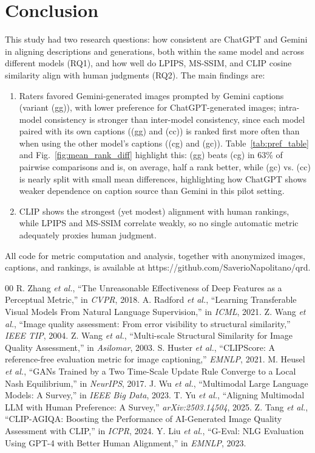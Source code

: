 \documentclass[conference]{IEEEtran}
\begin{document}
\section{Conclusion}
This study had two research questions: how consistent are ChatGPT and Gemini in aligning descriptions and generations, both within the same model and across different models (RQ1), and how well do LPIPS, MS-SSIM, and CLIP cosine similarity align with human judgments (RQ2). The main findings are:
\begin{enumerate}
  \item[RQ1] Raters favored Gemini-generated images prompted by Gemini captions (variant (gg)), with lower preference for ChatGPT-generated images; intra-model consistency is stronger than inter-model consistency, since each model paired with its own captions ((gg) and (cc)) is ranked first more often than when using the other model's captions ((cg) and (gc)). Table~\ref{tab:pref_table} and Fig.~\ref{fig:mean_rank_diff} highlight this: (gg) beats (cg) in 63\% of pairwise comparisons and is, on average, half a rank better, while (gc) vs. (cc) is nearly split with small mean differences, highlighting how ChatGPT shows weaker dependence on caption source than Gemini in this pilot setting.
  \item[RQ2] CLIP shows the strongest (yet modest) alignment with human rankings, while LPIPS and MS-SSIM correlate weakly, so no single automatic metric adequately proxies human judgment.
\end{enumerate}
All code for metric computation and analysis, together with anonymized images, captions,
and rankings, is available at https://github.com/SaverioNapolitano/qrd.
\begin{thebibliography}{00}
 R. Zhang \emph{et al.}, ``The Unreasonable Effectiveness of Deep Features as a Perceptual Metric,'' in \emph{CVPR}, 2018.
 A. Radford \emph{et al.}, ``Learning Transferable Visual Models From Natural Language Supervision,'' in \emph{ICML}, 2021.
 Z. Wang \emph{et al.}, ``Image quality assessment: From error visibility to structural similarity,'' \emph{IEEE TIP}, 2004.
 Z. Wang \emph{et al.}, ``Multi-scale Structural Similarity for Image Quality Assessment,'' in \emph{Asilomar}, 2003.
 S. Huster \emph{et al.}, ``CLIPScore: A reference-free evaluation metric for image captioning,'' \emph{EMNLP}, 2021.
 M. Heusel \emph{et al.}, ``GANs Trained by a Two Time-Scale Update Rule Converge to a Local Nash Equilibrium,'' in \emph{NeurIPS}, 2017.
 J. Wu \emph{et al.}, ``Multimodal Large Language Models: A Survey,'' in \emph{IEEE Big Data}, 2023.
 T. Yu \emph{et al.}, ``Aligning Multimodal LLM with Human Preference: A Survey,'' \emph{arXiv:2503.14504}, 2025.
 Z. Tang \emph{et al.}, ``CLIP-AGIQA: Boosting the Performance of AI-Generated Image Quality Assessment with CLIP,'' in \emph{ICPR}, 2024.
 Y. Liu \emph{et al.}, ``G-Eval: NLG Evaluation Using GPT-4 with Better Human Alignment,'' in \emph{EMNLP}, 2023.
\end{thebibliography}
 
\end{document}

